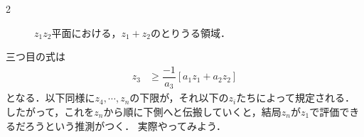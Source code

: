 \documentclass[../../main.tex]{subfiles}
\begin{document}
\begin{multicols}{2}
\begin{figure}[H]
    \caption{$z_1z_2$平面における，$z_1+z_2$のとりうる領域．}
    \label{2008-1:fig:1}
  \end{figure}

  三つ目の式は
  \begin{align}
    z_3
    & \ge \dfrac{-1}{a_3} \left[a_1 z_1 + a_2 z_2 \right]
  \end{align}
  となる．以下同様に$z_4,\cdots, z_{n}$の下限が，それ以下の$z_i$たちによって規定される．
  したがって，これを$z_n$から順に下側へと伝搬していくと，結局$z_n$が$z_1$で評価できるだろうという推測がつく．
  実際やってみよう．


\end{multicols}
\end{document}
